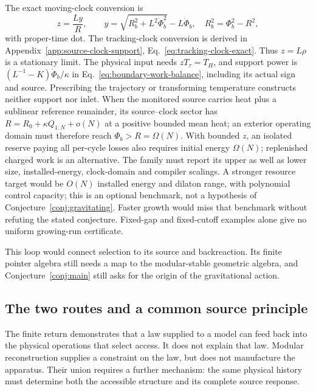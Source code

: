 \documentclass[12pt,a4paper]{article}
\begin{document}
The exact moving-clock conversion is
\begin{equation}\label{eq:loop-moving-clock}
 z=\frac{Ly}{R},\qquad
 y=\sqrt{R_b^2+L^2\dot\Phi_b^2}-L\dot\Phi_b,
 \quad R_b^2=\Phi_b^2-R^2,
\end{equation}
with proper-time dot. The tracking-clock conversion is derived in
Appendix~\ref{app:source-clock-support}, Eq.~\eqref{eq:tracking-clock-exact}.
Thus $z=L\rho$ is a stationary limit. The physical input needs
$zT_\tau=T_H$, and support power is
$(L^{-1}-K)\dot\Phi_b/\kappa$ in
Eq.~\eqref{eq:boundary-work-balance}, including its actual sign and source.
Prescribing the trajectory or transforming temperature constructs
neither support nor inlet. When the monitored source carries heat plus
a sublinear reference remainder, its source--clock sector has
$R=R_0+\kappa Q_{1:N}+o(N)$ at a positive bounded mean heat; an exterior
operating domain must therefore reach $\Phi_b>R=\Omega(N)$.
With bounded $z$, an isolated reserve paying all per-cycle losses also
requires initial energy $\Omega(N)$; replenished charged work is an
alternative. The family must report its upper as well as lower size, installed-energy,
clock-domain and compiler scalings. A stronger resource target would be
$O(N)$ installed energy and dilaton range, with polynomial control
capacity; this is an optional benchmark, not a hypothesis of
Conjecture~\ref{conj:gravitating}. Faster growth would miss that benchmark
without refuting the stated conjecture. Fixed-gap and fixed-cutoff
examples alone give no uniform growing-run certificate.

This loop would connect selection to its source and backreaction.
Its finite pointer algebra still needs a map to the modular-stable
geometric algebra, and Conjecture~\ref{conj:main} still asks for the
origin of the gravitational action.


\subsection{The two routes and a common source principle}
\label{sec:source-principle}

The finite return demonstrates that a law supplied to a model can feed
back into the physical operations that select access. It does not explain
that law. Modular reconstruction supplies a constraint on the law, but
does not manufacture the apparatus. Their union requires a further
mechanism: the same physical history must determine both the accessible
structure and its complete source response.
\end{document}
